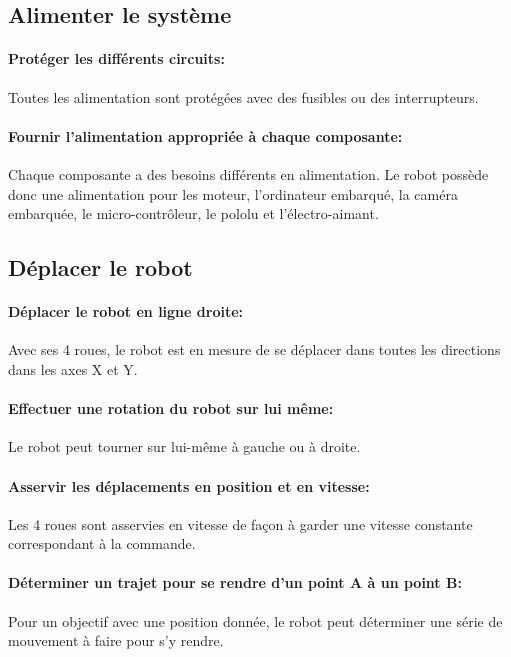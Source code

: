 \subsection{Alimenter le système}

\paragraph{Protéger les différents circuits:}
Toutes les alimentation sont protégées avec des fusibles ou des interrupteurs.

\paragraph{Fournir l'alimentation appropriée à chaque composante:}
Chaque composante a des besoins différents en alimentation. Le robot possède donc une alimentation pour les moteur, l'ordinateur embarqué, la caméra embarquée, le micro-contrôleur, le pololu et l'électro-aimant.

\subsection{Déplacer le robot}

\paragraph{Déplacer le robot en ligne droite:}
Avec ses 4 roues, le robot est en mesure de se déplacer dans toutes les directions dans les axes X et Y.

\paragraph{Effectuer une rotation du robot sur lui même:}
Le robot peut tourner sur lui-même à gauche ou à droite.

\paragraph{Asservir les déplacements en position et en vitesse:}
Les 4 roues sont asservies en vitesse de façon à garder une vitesse constante correspondant à la commande.

\paragraph{Déterminer un trajet pour se rendre d'un point A à un point B:}
Pour un objectif avec une position donnée, le robot peut déterminer une série de mouvement à faire pour s'y rendre.


